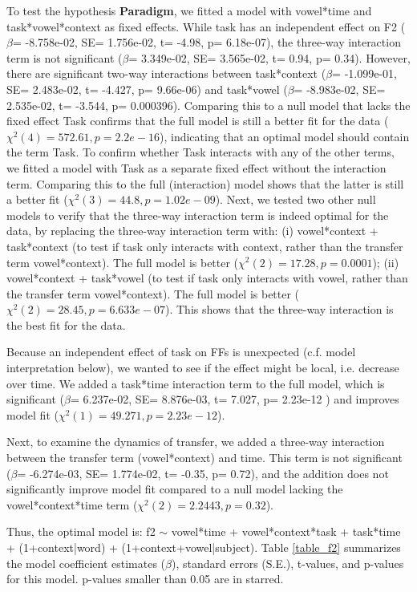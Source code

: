 \documentclass[12 pt]{article}
\begin{document}
To test the hypothesis \textbf{Paradigm}, we fitted a model with vowel*time and task*vowel*context as fixed effects. While task has an independent effect on F2 ($\beta$= -8.758e-02, SE= 1.756e-02, t= -4.98, p= 6.18e-07), the three-way interaction term is not significant ($\beta$= 3.349e-02, SE= 3.565e-02, t= 0.94, p= 0.34). However, there are significant two-way interactions between task*context ($\beta$= -1.099e-01, SE= 2.483e-02, t= -4.427, p= 9.66e-06) and task*vowel ($\beta$= -8.983e-02, SE= 2.535e-02, t= -3.544, p= 0.000396). Comparing this to a null model that lacks the fixed effect Task confirms that the full model is still a better fit for the data ($\chi^2(4) = 572.61, p=  2.2e-16$), indicating that an optimal model should contain the term Task. To confirm whether Task interacts with any of the other terms, we fitted a model with Task as a separate fixed effect without the interaction term. Comparing this to the full (interaction) model shows that the latter is still a better fit ($\chi^2(3) = 44.8, p= 1.02e-09$). Next, we tested two other null models to verify that the three-way interaction term is indeed optimal for the data, by replacing the three-way interaction term with: (i) vowel*context + task*context (to test if task only interacts with context, rather than the transfer term vowel*context). The full model is better ($\chi^2(2) = 17.28, p= 0.0001$); (ii) vowel*context + task*vowel (to test if task only interacts with vowel, rather than the transfer term vowel*context). The full model is better ($\chi^2(2) = 28.45, p= 6.633e-07$). This shows that the three-way interaction is the best fit for the data.

Because an independent effect of task on FFs is unexpected (c.f. model interpretation below), we wanted to see if the effect might be local, i.e. decrease over time. We added a task*time interaction term to the full model, which is significant ($\beta$= 6.237e-02, SE=  8.876e-03, t= 7.027, p= 2.23e-12 ) and improves model fit ($\chi^2(1) = 49.271, p= 2.23e-12$).
	
Next, to examine the dynamics of transfer, we added a three-way interaction between the transfer term (vowel*context) and time. This term is not significant ($\beta$= -6.274e-03, SE= 1.774e-02, t= -0.35, p= 0.72), and the addition does not significantly improve model fit compared to a null model lacking the vowel*context*time term ($\chi^2(2) = 2.2443, p= 0.32$).

Thus, the optimal model is: f2 $\sim$ vowel*time + vowel*context*task + task*time + (1+context|word) + (1+context+vowel|subject). Table \ref{table_f2} summarizes the model coefficient estimates ($\beta$), standard errors (S.E.), t-values, and p-values for this model. p-values smaller than 0.05 are in starred.
\end{document}
